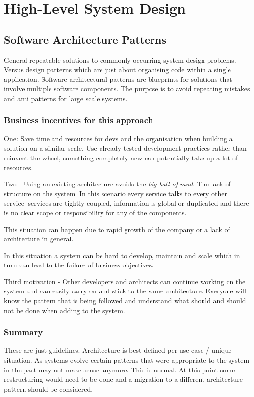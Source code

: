 \chapter{High-Level System Design}

\section{Software Architecture Patterns}
General repeatable solutions to commonly occurring system design problems.
Versus design patterns which are just about organising code within a single application.
Software architectural patterns are blueprints for solutions that involve multiple software components.
The purpose is to avoid repeating mistakes and anti patterns for large scale systems.

\subsection{Business incentives for this approach}
One: Save time and resources for devs and the organisation when building a solution on a similar scale.
Use already tested development practices rather than reinvent the wheel, something completely new can potentially take up a lot of resources.

Two - Using an existing architecture avoids the \textit{big ball of mud}.
The lack of structure on the system.
In this scenario every service talks to every other service, services are tightly coupled, information is global or duplicated and there is no clear scope or responsibility for any of the components.

This situation can happen due to rapid growth of the company or a lack of architecture in general.

In this situation a system can be hard to develop, maintain and scale which in turn can lead to the failure of business objectives.

Third motivation - Other developers and architects can continue working on the system and can easily carry on and stick to the same architecture.
Everyone will know the pattern that is being followed and understand what should and should not be done when adding to the system.

\subsection{Summary}
These are just guidelines.
Architecture is best defined per use case / unique situation.
As systems evolve certain patterns that were appropriate to the system in the past may not make sense anymore.
This is normal.
At this point some restructuring would need to be done and a migration to a different architecture pattern should be considered.

